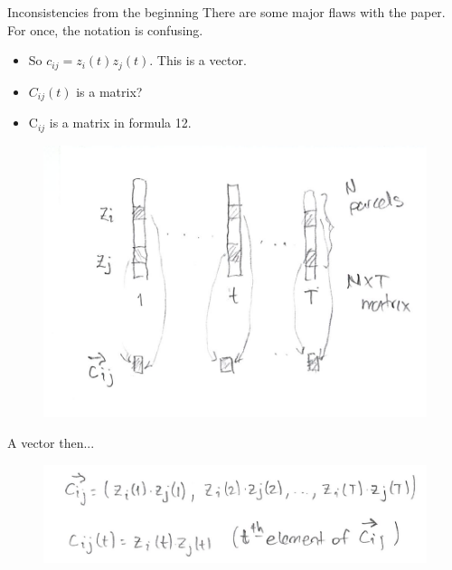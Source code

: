 \documentclass{beamer}
\begin{document}
	\begin{frame}{Inconsistencies from the beginning}
		There are some major flaws with the paper. For once, the notation is confusing.
		\begin{itemize}
			\item So $c_{ij}= z_i(t) z_j (t)$. This is a vector.
			\item $C_{ij}(t)$ is a matrix?
			\item $\textrm{C}_{ij}$ is a matrix in formula 12. 
		\end{itemize}
		\begin{figure}[h]
		\centering
			\includegraphics[scale=0.4]{../Figures/fig_novelli_description1.png}
	\end{figure}
	\end{frame}

	\begin{frame}{A vector then...}
		\begin{figure}[h]
	\centering
		\includegraphics[scale=0.4]{../Figures/fig_novelli_description2.png}
\end{figure}
		
	\end{frame}
\end{document}
